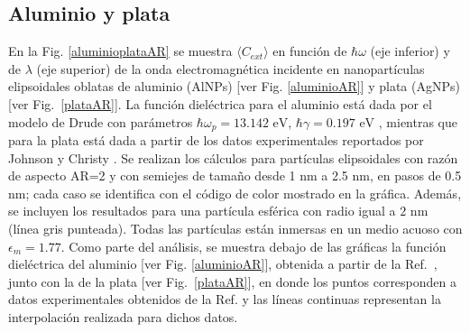\subsection*{Aluminio y plata}
En la Fig. \ref{aluminioplataAR} se muestra $\langle C_{ext}\rangle$ en función de $\hbar\omega$ (eje inferior) y de  $\lambda$ (eje superior) de la onda electromagnética incidente en nanopartículas elipsoidales oblatas de aluminio (AlNPs) [ver Fig. \ref{aluminioAR}] y plata (AgNPs) [ver Fig.~\ref{plataAR}]. La función dieléctrica para el aluminio está dada por el modelo de Drude con parámetros $\hbar\omega_p=13.142\text{ eV}$, $\hbar\gamma=0.197\text{ eV}$ \cite{Aluminio}, mientras que para la plata  está dada a partir de los datos experimentales reportados por Johnson y Christy \cite{Plata}. Se realizan los cálculos para partículas elipsoidales con razón de aspecto AR=2 y con semiejes de tamaño desde 1 nm a 2.5 nm, en pasos de 0.5 nm; cada caso se identifica con el código de color mostrado en la gráfica. Además, se incluyen los resultados para una partícula esférica con radio igual a $2 \text{ nm}$ (línea gris punteada). Todas las partículas están  inmersas en un medio acuoso con $\epsilon_m=1.77$. Como parte del análisis, se muestra debajo de las gráficas la función dieléctrica del aluminio [ver Fig. \ref{aluminioAR}], obtenida a partir de la Ref.~\cite{Aluminio}, junto con la de la plata [ver Fig.~\ref{plataAR}], en donde los puntos corresponden a datos experimentales obtenidos de la Ref. \cite{Plata} y las líneas continuas representan la interpolación realizada para dichos datos.
\\

